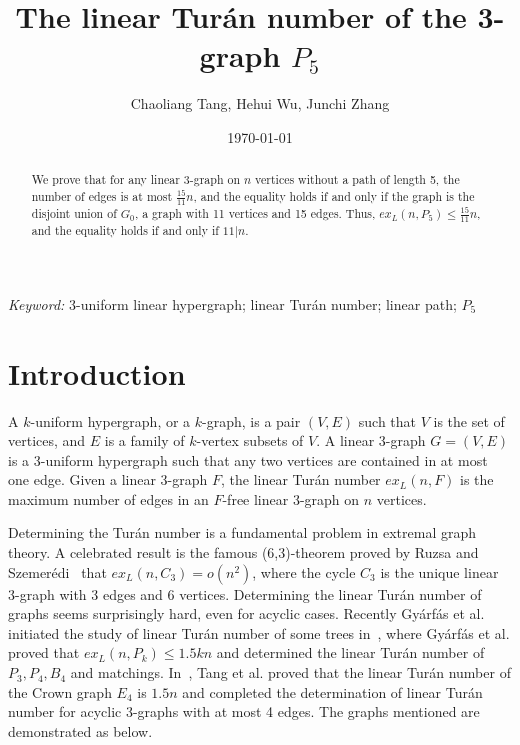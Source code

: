 \documentclass[a4paper]{article}
\title{\vspace{-2cm}The linear Tur\'an number of the 3-graph $P_5$}
\author{Chaoliang Tang, Hehui Wu, Junchi Zhang}
\date{\today}
\newcommand{\emphd}[1]{{\fontseries{b}\selectfont\textsf{#1}}}
\begin{document}
\maketitle

\begin{abstract}
We prove that for any linear 3-graph on $n$ vertices without a path of length 5, the number of edges is at most $\frac{15}{11}n$, and the equality holds if and only if the graph is the disjoint union of $G_0$, a graph with 11 vertices and 15 edges. Thus, $ex_L(n,P_5)\leq \frac{15}{11}n$, and the equality holds if and only if $11|n$.
\end{abstract}

\textit{Keyword:} 3-uniform linear hypergraph; linear Tur\'an number; linear path; $P_5$


\section{Introduction}
A \emphd{$k$-uniform hypergraph}, or a \emphd{$k$-graph}, is a pair $(V,E)$ such that $V$ is the set of vertices, and $E$ is a family of $k$-vertex subsets of $V$. A \emphd{linear 3-graph} $G=(V,E)$ is a 3-uniform hypergraph such that any two vertices are contained in at most one edge. Given a linear {3-graph} $F$, the \emphd{linear Tur\'an number} $ex_L(n,F)$ is the maximum number of edges in an $F$-free linear 3-graph on $n$ vertices.

Determining the Tur\'an number is a fundamental problem in extremal graph theory. A celebrated result is the famous (6,3)-theorem proved by Ruzsa and Szemer\'edi~\cite{MR519318}  that $ex_L(n,C_{3})=o(n^2)$, where the cycle $C_3$ is the unique linear 3-graph with 3 edges and 6 vertices. Determining the linear Tur\'an number of graphs seems surprisingly hard, even for {acyclic cases}.
Recently Gyárfás {et al.} initiated the study of linear Tur\'an number of some trees in~\cite{MR4315540}, where Gyárfás et al. proved that $ex_L(n,P_k)\leq 1.5kn$ and determined the linear Tur\'an number of $P_3, P_4, B_4$ and matchings. In~\cite{MR4477845}, Tang et al. proved that the linear Tur\'an number of the Crown graph $E_4$ is $1.5n$ and completed the determination of linear Tur\'an number for acyclic 3-graphs with at most 4 edges. The graphs mentioned are demonstrated as below.
\end{document}
